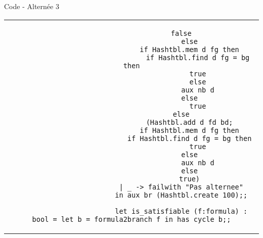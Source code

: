 \documentclass[]{beamer}
\begin{document}
\begin{frame}[fragile]{Code - Alternée 3}
    \begin{center}
        \begin{tabular}{c}
            \begin{lstlisting}
                        false
                            else
                            if Hashtbl.mem d fg then
                                if Hashtbl.find d fg = bg then
                                true
                                else
                                aux nb d
                            else
                                true
                        else
                            (Hashtbl.add d fd bd;
                            if Hashtbl.mem d fg then
                            if Hashtbl.find d fg = bg then
                                true
                            else
                                aux nb d
                            else
                            true)
                        | _ -> failwith "Pas alternee"
                        in aux br (Hashtbl.create 100);;
          
                        let is_satisfiable (f:formula) : bool = let b = formula2branch f in has_cycle b;;
            \end{lstlisting}
        \end{tabular}
    \end{center}   
\end{frame}
\end{document}
